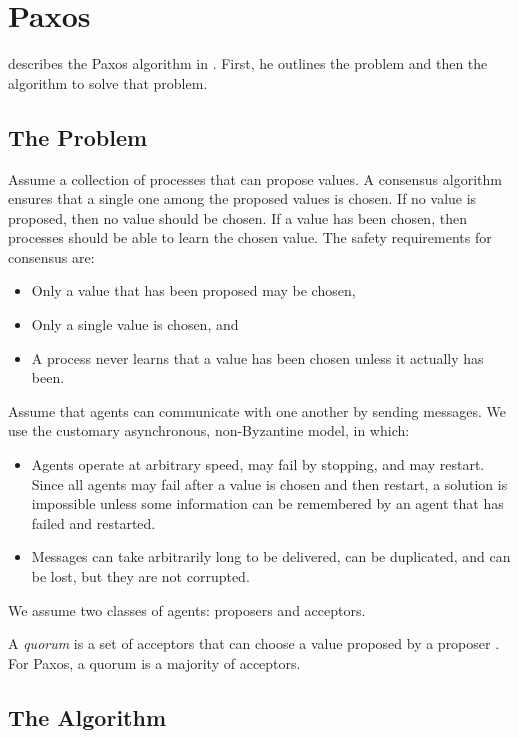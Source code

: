 \section{Paxos}
\citeauthor{Lamport01} describes the Paxos algorithm in \cite{Lamport01}.
First, he outlines the problem and then the algorithm to solve that problem.

\subsection{The Problem}
Assume a collection of processes that can propose values.
A consensus algorithm ensures that a single one among the proposed values is chosen.
If no value is proposed, then no value should be chosen.
If a value has been chosen, then processes should be able to learn the chosen value.
The safety requirements for consensus are:

\begin{itemize}
    \item Only a value that has been proposed may be chosen,
    \item Only a single value is chosen, and
    \item A process never learns that a value has been chosen unless it actually has been.
\end{itemize}

Assume that agents can communicate with one another by sending messages.
We use the customary asynchronous, non-Byzantine model, in which:

\begin{itemize}
    \item Agents operate at arbitrary speed, may fail by stopping, and may restart.
    Since all agents may fail after a value is chosen and then restart, a solution is impossible unless some information can be remembered by an agent that has failed and restarted.
    \item Messages can take arbitrarily long to be delivered, can be duplicated, and can be lost, but they are not corrupted.
\end{itemize}

We assume two classes of agents: proposers and acceptors.

A \emph{quorum} is a set of acceptors that can choose a value proposed by a proposer \cite{Lamport06}.
For Paxos, a quorum is a majority of acceptors.

\subsection{The Algorithm}

